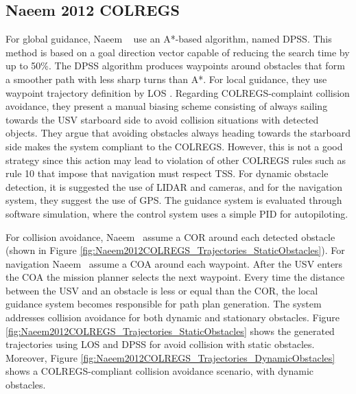     \subsection{Naeem 2012 COLREGS}
    For global guidance, Naeem \etal~\cite{Naeem2012COLREGS} use an A*-based algorithm, named \ac{DPSS}. 
    This method is based on a goal direction vector capable of reducing the search time by up to 50\%\cite{Yang2010Efficient}. The \ac{DPSS} algorithm produces waypoints around obstacles that form a smoother path with less sharp turns than A*. For local guidance, they use waypoint trajectory definition by \ac{LOS} \cite{Healey1993Multivariable}. Regarding \ac{COLREGS}-complaint collision avoidance, they present a manual biasing scheme consisting of always sailing towards the \ac{USV} starboard side to avoid collision situations with detected objects. They argue that avoiding obstacles always heading towards the starboard side makes the system compliant to the \ac{COLREGS}. However, this is not a good strategy since this action may lead to violation of other \ac{COLREGS} rules such as rule 10 that impose that navigation must respect \acf{TSS}.
    For dynamic obstacle detection, it is suggested the use of \ac{LIDAR} and cameras, and for the navigation system, they suggest the use of \ac{GPS}. The guidance system is evaluated through software simulation, where the control system uses a simple \ac{PID} for autopiloting.
        
    For collision avoidance, Naeem \etal~assume a \ac{COR} around each detected obstacle (shown in Figure \ref{fig:Naeem2012COLREGS_Trajectories_StaticObstacles}). For navigation Naeem \etal~assume a \ac{COA} around each waypoint. After the \ac{USV} enters the \ac{COA} the mission planner selects the next waypoint. Every time the distance between the \ac{USV} and an obstacle is less or equal than the \ac{COR}, the local guidance system becomes responsible for path plan generation. The system addresses collision avoidance for both dynamic and stationary obstacles. Figure \ref{fig:Naeem2012COLREGS_Trajectories_StaticObstacles} shows the generated trajectories using \ac{LOS} and \ac{DPSS} for avoid collision with static obstacles. Moreover, Figure \ref{fig:Naeem2012COLREGS_Trajectories_DynamicObstacles} shows a \ac{COLREGS}-compliant collision avoidance scenario, with dynamic obstacles.
    
